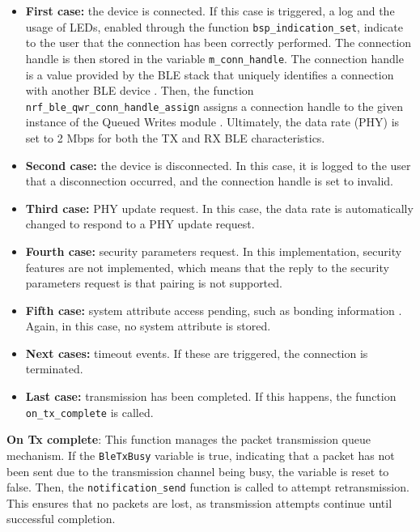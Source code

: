 \documentclass{Configuration_Files/PoliMi3i_thesis}
\begin{document}
\begin{itemize}
    \item \textbf{First case:} the device is connected. If this case is triggered, a log and the usage of LEDs, enabled through the function \texttt{bsp\_indication\_set}, indicate to the user that the connection has been correctly performed. The connection handle is then stored in the variable \texttt{m\_conn\_handle}. The connection handle is a value provided by the BLE stack that uniquely identifies a connection with another BLE device \cite{BluetoothLowEnergy2016}. Then, the function \texttt{nrf\_ble\_qwr\_conn\_handle\_assign} assigns a connection handle to the given instance of the Queued Writes module \cite{NordicSemiconductorInfocenterd}. Ultimately, the data rate (PHY) is set to 2 Mbps for both the TX and RX BLE characteristics.
    
    \item \textbf{Second case:} the device is disconnected. In this case, it is logged to the user that a disconnection occurred, and the connection handle is set to invalid.
    
    \item \textbf{Third case:} PHY update request. In this case, the data rate is automatically changed to respond to a PHY update request.
    
    \item \textbf{Fourth case:} security parameters request. In this implementation, security features are not implemented, which means that the reply to the security parameters request is that pairing is not supported.
    
    \item \textbf{Fifth case:} system attribute access pending, such as bonding information \cite{NordicSemiconductorInfocenterf}. Again, in this case, no system attribute is stored.
    
    \item \textbf{Next cases:} timeout events. If these are triggered, the connection is terminated.
    
    \item \textbf{Last case:} transmission has been completed. If this happens, the function \texttt{on\_tx\_complete} is called.
\end{itemize}


\textbf{On Tx complete}: This function manages the packet transmission queue mechanism. If the \texttt{BleTxBusy} variable is true, indicating that a packet has not been sent due to the transmission channel being busy, the variable is reset to false. Then, the \texttt{notification\_send} function is called to attempt retransmission. This ensures that no packets are lost, as transmission attempts continue until successful completion.
\end{document}
